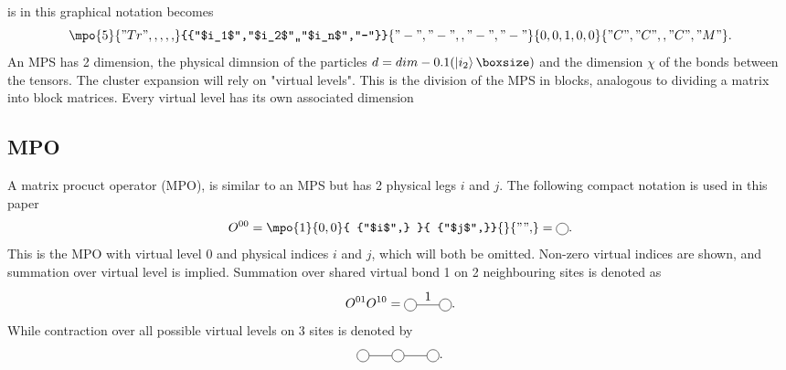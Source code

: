 \documentclass[twocolumn]{article}
\newcounter{a}
\newcounter{b}
\begin{document}
 is in this graphical notation becomes
\begin{equation}\label{eq:general_mps}
    \mpo{5}{{"Tr",,,,,}}{{"$i_1$","$i_2$",,"$i_n$","-"}}{{"-","-",,"-","-"}}{{0,0,1,0,0}}{{"C", "C",,"C","M" }}.
\end{equation}
An MPS has 2 dimension, the physical dimnsion of the particles $d = dim \left( \ket{i_2}  \right)$ and the dimension $\chi$ of the bonds between the tensors. The cluster expansion will rely on "virtual levels". This is the division of the MPS in blocks, analogous to dividing a matrix into block matrices. Every virtual level has its own associated dimension
\subsection{MPO}
A matrix procuct operator (MPO), is similar to an MPS but has 2 physical legs $i$ and $j$. The following compact notation is used in this paper
\begin{equation}
    O^{0 0} = \mpo{1}{ {0,0}  }{ {"$i$",}  }{ {"$j$",}}{}{{"",}} = \mpob{1}{ {0,0}  }{ {"$i$",}  }{ {"$j$",}}{}{{"",}}.
\end{equation}
This is the MPO with virtual level 0 and physical indices $i$ and $j$, which will both be omitted. Non-zero virtual indices are shown, and summation over virtual level is implied. Summation over shared virtual bond 1 on 2 neighbouring sites is denoted as
\begin{equation}
    O^{0 1} O^{1 0} = \mpob{2}{ {0,1,0}  }{ {"$i_1$","$i_2$"}  }{ {"$j_1$","$j_1$",}}{}{{"",}}.
\end{equation}
While contraction over all possible virtual levels on 3 sites is denoted by
\begin{equation} \label{PEPO_3}
    \mpob{3}{ {0,,,0}  }{}{}{}{{"",,}} .
\end{equation}




\end{document}
